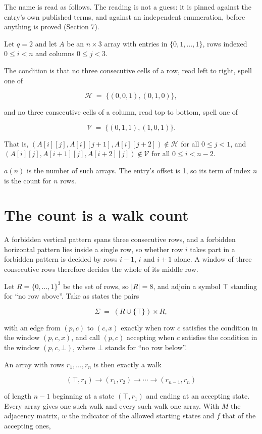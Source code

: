 \documentclass[11pt]{article}
\theoremstyle{definition}
\begin{document}
The name is read as follows. The reading is not a guess: it is pinned against the entry's own published terms, and against an independent enumeration, before anything is proved (Section 7).

Let $q = 2$ and let $A$ be an $n \times 3$ array with entries in $\{0,1,\dots,1\}$, rows indexed $0 \le i < n$ and columns $0 \le j < 3$.

The condition is that no three consecutive cells of a row, read left to right, spell one of

\[\mathcal{H} \;=\; \{(0,0,1), (0,1,0)\},\]

and no three consecutive cells of a column, read top to bottom, spell one of

\[\mathcal{V} \;=\; \{(0,1,1), (1,0,1)\}.\]

That is, $(A[i][j],A[i][j{+}1],A[i][j{+}2]) \notin \mathcal{H}$ for all $0 \le j < 1$, and $(A[i][j],A[i{+}1][j],A[i{+}2][j]) \notin \mathcal{V}$ for all $0 \le i < n-2$.

$a(n)$ is the number of such arrays. The entry's offset is 1, so its term of index $n$ is the count for $n$ rows.

\section{The count is a walk count}

A forbidden vertical pattern spans three consecutive rows, and a forbidden horizontal pattern lies inside a single row, so whether row $i$ takes part in a forbidden pattern is decided by rows $i-1$, $i$ and $i+1$ alone. A window of three consecutive rows therefore decides the whole of its middle row.

Let $R = \{0,\dots,1\}^{3}$ be the set of rows, so $|R| = 8$, and adjoin a symbol $\top$ standing for ``no row above''. Take as states the pairs

\[\Sigma \;=\; (R \cup \{\top\}) \times R,\]

with an edge from $(p,c)$ to $(c,x)$ exactly when row $c$ satisfies the condition in the window $(p,c,x)$, and call $(p,c)$ accepting when $c$ satisfies the condition in the window $(p,c,\bot)$, where $\bot$ stands for ``no row below''.

An array with rows $r_1,\dots,r_n$ is then exactly a walk

\[(\top,r_1) \to (r_1,r_2) \to \cdots \to (r_{n-1},r_n)\]

of length $n-1$ beginning at a state $(\top,r_1)$ and ending at an accepting state. Every array gives one such walk and every such walk one array. With $M$ the adjacency matrix, $w$ the indicator of the allowed starting states and $f$ that of the accepting ones,
\end{document}
